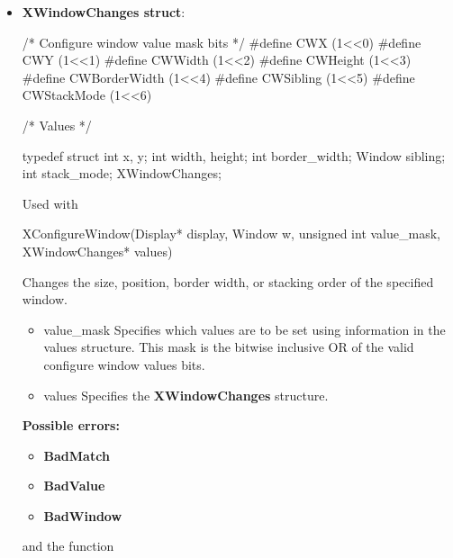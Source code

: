 \documentclass{report}
\begin{document}
\begin{itemize}
\begin{itemize}
            \end{itemize}
        \item \textbf{XWindowChanges struct}: 
            \bigbreak \noindent 
            \begin{cppcode}
                /* Configure window value mask bits */
                #define CWX                 (1<<0)
                #define CWY                 (1<<1)
                #define CWWidth             (1<<2)
                #define CWHeight            (1<<3)
                #define CWBorderWidth       (1<<4)
                #define CWSibling           (1<<5)
                #define CWStackMode         (1<<6)

                /* Values */

                typedef struct {
                    int x, y;
                    int width, height;
                    int border_width;
                    Window sibling;
                    int stack_mode;
                } XWindowChanges;
            \end{cppcode}
            \bigbreak \noindent 
            Used with
            \bigbreak \noindent 
            \begin{cppcode}
                XConfigureWindow(Display* display, Window w, unsigned int value_mask, XWindowChanges* values)
            \end{cppcode}
            \bigbreak \noindent
            Changes the size, position, border width, or stacking order of the specified window.
            \begin{itemize}
                \item value\_mask Specifies which values are to be set using information in the values structure. This mask is the bitwise inclusive OR of the valid configure window values bits.
                \item values Specifies the \textbf{XWindowChanges} structure.
            \end{itemize}
            \bigbreak \noindent
            \textbf{Possible errors:}
            \begin{itemize}
                \item \textbf{BadMatch}
                \item \textbf{BadValue}
                \item \textbf{BadWindow}
            \end{itemize}
            and the function
            \bigbreak \noindent 
            \begin{cppcode}

\end{cppcode}
\end{itemize}
\end{document}
